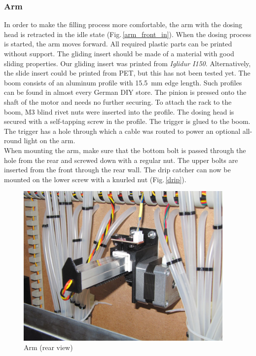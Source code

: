 \documentclass[a4paper]{scrartcl}
\begin{document}
\subsubsection{Arm}
In order to make the filling process more comfortable, the arm with the dosing head is retracted in the idle state (Fig.\,\ref{arm_front_in}). When the dosing process is started, the arm moves forward. All required plastic parts can be printed without support. The gliding insert should be made of a material with good sliding properties. Our gliding insert was printed from \textit{Iglidur I150}. Alternatively, the slide insert could be printed from PET, but this has not been tested yet. The boom consists of an aluminum profile with \SI{15.5}{\milli\metre} edge length. Such profiles can be found in almost every German DIY store. The pinion is pressed onto the shaft of the motor and needs no further securing. To attach the rack to the boom, M3 blind rivet nuts were inserted into the profile. The dosing head is secured with a self-tapping screw in the profile. The trigger is glued to the boom. The trigger has a hole through which a cable was routed to power an optional all-round light on the arm. \\
When mounting the arm, make sure that the bottom bolt is passed through the hole from the rear and screwed down with a regular nut. The upper bolts are inserted from the front through the rear wall. The drip catcher can now be mounted on the lower screw with a knurled nut (Fig.\,\ref{drip}). 

\begin{figure}[H]
  \centering
  \includegraphics[height=8cm]{pics/arm_rear.jpg}
  \caption{Arm (rear view)} \label{arm_rear}
\end{figure}
\end{document}
